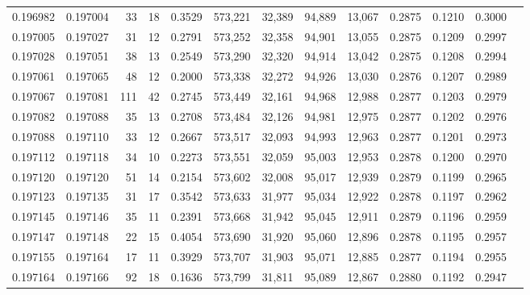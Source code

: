 \begin{tabular}{rrrrrrrrrrrrr}
0.196982 & 0.197004 &    33 &  18 &                                     0.3529 & 573,221 &  32,389 &  94,889 &  13,067 & 0.2875 & 0.1210 & 0.3000 \\
0.197005 & 0.197027 &    31 &  12 &                                     0.2791 & 573,252 &  32,358 &  94,901 &  13,055 & 0.2875 & 0.1209 & 0.2997 \\
0.197028 & 0.197051 &    38 &  13 &                                     0.2549 & 573,290 &  32,320 &  94,914 &  13,042 & 0.2875 & 0.1208 & 0.2994 \\
0.197061 & 0.197065 &    48 &  12 &                                     0.2000 & 573,338 &  32,272 &  94,926 &  13,030 & 0.2876 & 0.1207 & 0.2989 \\
0.197067 & 0.197081 &   111 &  42 &                                     0.2745 & 573,449 &  32,161 &  94,968 &  12,988 & 0.2877 & 0.1203 & 0.2979 \\
0.197082 & 0.197088 &    35 &  13 &                                     0.2708 & 573,484 &  32,126 &  94,981 &  12,975 & 0.2877 & 0.1202 & 0.2976 \\
0.197088 & 0.197110 &    33 &  12 &                                     0.2667 & 573,517 &  32,093 &  94,993 &  12,963 & 0.2877 & 0.1201 & 0.2973 \\
0.197112 & 0.197118 &    34 &  10 &                                     0.2273 & 573,551 &  32,059 &  95,003 &  12,953 & 0.2878 & 0.1200 & 0.2970 \\
0.197120 & 0.197120 &    51 &  14 &                                     0.2154 & 573,602 &  32,008 &  95,017 &  12,939 & 0.2879 & 0.1199 & 0.2965 \\
0.197123 & 0.197135 &    31 &  17 &                                     0.3542 & 573,633 &  31,977 &  95,034 &  12,922 & 0.2878 & 0.1197 & 0.2962 \\
0.197145 & 0.197146 &    35 &  11 &                                     0.2391 & 573,668 &  31,942 &  95,045 &  12,911 & 0.2879 & 0.1196 & 0.2959 \\
0.197147 & 0.197148 &    22 &  15 &                                     0.4054 & 573,690 &  31,920 &  95,060 &  12,896 & 0.2878 & 0.1195 & 0.2957 \\
0.197155 & 0.197164 &    17 &  11 &                                     0.3929 & 573,707 &  31,903 &  95,071 &  12,885 & 0.2877 & 0.1194 & 0.2955 \\
0.197164 & 0.197166 &    92 &  18 &                                     0.1636 & 573,799 &  31,811 &  95,089 &  12,867 & 0.2880 & 0.1192 & 0.2947 \\

\end{tabular}
